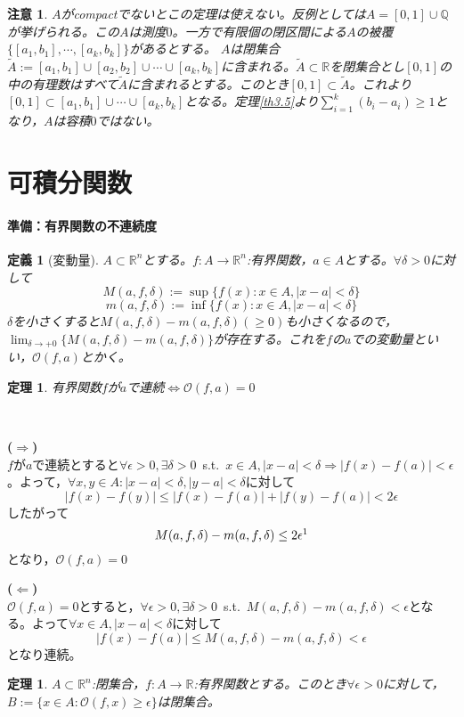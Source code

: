 \documentclass[dvipdfmx,a4j,10pt]{jsarticle}
\makeatletter
\theoremstyle{mystyle1}
\newtheorem{thm}[dfn]{定理}
\theoremstyle{mystyle2}
\newtheorem{dfn*}{定義}
\newtheorem{thm*}{定理}
\newtheorem{note}{注意}
\renewenvironment{proof}[1][\proofname]{\par
  \pushQED{\qed}%
  \normalfont
  \topsep6\p@\@plus6\p@ \trivlist
  \item[\hskip\labelsep{\bfseries\sffamily #1}]\ignorespaces
}{%
  \popQED\endtrivlist\@endpefalse
}
\renewcommand\proofname{証明}
\makeatother
\begin{document}
\begin{note}
	$A$がcompactでないとこの定理は使えない。反例としては$A=[0,1]\cup\mathbb{Q}$が挙げられる。この$A$は測度$0$。一方で有限個の閉区間による$A$の被覆$\{[a_1,b_1],\cdots,[a_k,b_k]\}$があるとする。
	$A$は閉集合$\tilde{A}:=[a_1,b_1]\cup[a_2,b_2]\cup\cdots\cup[a_k,b_k]$に含まれる。$\tilde{A}\subset\mathbb{R}$を閉集合とし$[0,1]$の中の有理数はすべて$\tilde{A}$に含まれるとする。このとき$[0,1]\subset\tilde{A}$。これより$[0,1]\subset[a_1,b_1]\cup\cdots\cup[a_k,b_k]$となる。定理\ref{th3.5}より$\displaystyle\sum_{i=1}^k(b_i-a_i)\geq 1$となり，$A$は容積$0$ではない。
\end{note}


\newpage


\section{可積分関数}
\paragraph{準備：有界関数の不連続度}
\begin{dfn*}[変動量]
$A\subset \mathbb{R}^n$とする。$f:A\to\mathbb{R}^n$:有界関数，$a\in A$とする。$\forall\delta>0$に対して
\[
	M(a,f,\delta):=\sup\{f(x):x\in A,|x-a|<\delta\}
\]
\[
	m(a,f,\delta):=\inf\{f(x):x\in A,|x-a|<\delta\}
\]
$\delta$を小さくすると$M(a,f,\delta)-m(a,f,\delta)(\geq 0)$も小さくなるので，$\displaystyle\lim_{\delta\to+0}\{M(a,f,\delta)-m(a,f,\delta)\}$が存在する。これを$f$の$a$での変動量といい，$\mathscr{O}(f,a)$とかく。
\end{dfn*}
\begin{thm*}
有界関数$f$が$a$で連続$\Leftrightarrow$$\mathscr{O}(f,a)=0$
\end{thm*}
\begin{proof}\
	\par\noindent\textbf{($\Rightarrow$)}\\
	$f$が$a$で連続とすると$\forall\epsilon>0,\exists\delta>0$\ s.t.\ $x\in A,|x-a|<\delta\Rightarrow|f(x)-f(a)|<\epsilon$。よって，$\forall x,y\in A:|x-a|<\delta,|y-a|<\delta$に対して
	\[
	|f(x)-f(y)|\leq |f(x)-f(a)|+|f(y)-f(a)|< 2\epsilon
	\]
	したがって
	\[
	M(a,f,\delta)-m(a,f,\delta)\leq 2\epsilon \footnotemark
	\]
	となり，$\mathscr{O}(f,a)=0$\\
	\par\noindent\textbf{($\Leftarrow$)}\\
	$\mathscr{O}(f,a)=0$とすると，$\forall\epsilon>0,\exists\delta>0$\ s.t.\ $M(a,f,\delta)-m(a,f,\delta)<\epsilon$となる。よって$\forall x\in A,|x-a|<\delta$に対して
	\[
		|f(x)-f(a)|\leq M(a,f,\delta)-m(a,f,\delta)<\epsilon
	\]
	となり連続。
\end{proof}
\begin{framed}
	\begin{thm}\label{th3.7}
		$A\subset\mathbb{R}^n$:閉集合，$f:A\to\mathbb{R}$:有界関数とする。このとき$\forall\epsilon>0$に対して，$B:=\{x\in A:\mathscr{O}(f,x)\geq \epsilon\}$は閉集合。
	\end{thm}
\end{framed}
\end{document}
